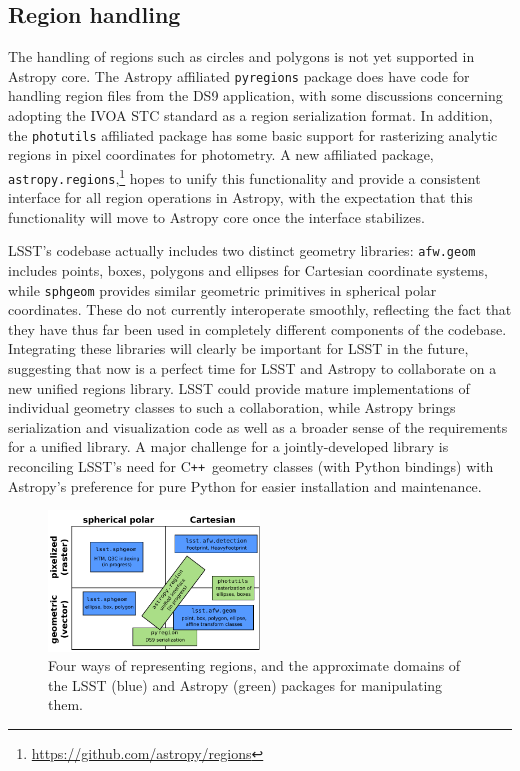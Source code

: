 \documentclass[]{spie}  %
\newcommand{\CPP}{C\texttt{++}\xspace}  %
\begin{document}
\subsection{Region handling}

The handling of regions such as circles and polygons is not yet supported in Astropy core.
The Astropy affiliated \texttt{pyregions} package does have code for handling region files from the DS9 application\cite{2005ASPC..347..110J}, with some discussions concerning adopting the IVOA STC standard\cite{2007ivoa.spec.1030R} as a region serialization format.
In addition, the \texttt{photutils} affiliated package has some basic support for rasterizing analytic regions in pixel coordinates for photometry.
A new affiliated package, \texttt{astropy.regions},\footnote{\url{https://github.com/astropy/regions}} hopes to unify this functionality and provide a consistent interface for all region operations in Astropy, with the expectation that this functionality will move to Astropy core once the interface stabilizes.

LSST's codebase actually includes two distinct geometry libraries:
\texttt{afw.geom} includes points, boxes, polygons and ellipses for Cartesian coordinate systems, while \texttt{sphgeom} provides similar geometric primitives in spherical polar coordinates.
These do not currently interoperate smoothly, reflecting the fact that they have thus far been used in completely different components of the codebase.
Integrating these libraries will clearly be important for LSST in the future, suggesting that now is a perfect time for LSST and Astropy to collaborate on a new unified regions library.
LSST could provide mature implementations of individual geometry classes to such a collaboration, while Astropy brings serialization and visualization code as well as a broader sense of the requirements for a unified library.
A major challenge for a jointly-developed library is reconciling LSST's need for \CPP\ geometry classes (with Python bindings) with Astropy's preference for pure Python for easier installation and maintenance.

\begin{figure}[t]
\begin{center}
\includegraphics[width=0.5\textwidth]{regions}
\end{center}
\caption{Four ways of representing regions, and the approximate domains of the LSST (blue) and Astropy (green) packages for manipulating them.}
\label{fig:regions}
\end{figure}
\end{document}
